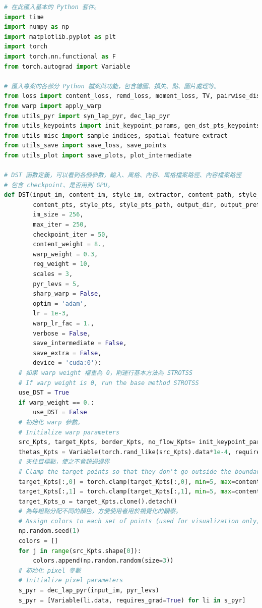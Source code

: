 \documentclass[10pt,UTF8]{ctexart}
\begin{document}
\begin{lstlisting}[language={python}]
# 在此匯入基本的 Python 套件。
import time
import numpy as np
import matplotlib.pyplot as plt
import torch
import torch.nn.functional as F
from torch.autograd import Variable

# 匯入專案的各部分 Python 檔案與功能，包含繪圖、損失、點、圖片處理等。
from loss import content_loss, remd_loss, moment_loss, TV, pairwise_distances_sq_l2
from warp import apply_warp
from utils_pyr import syn_lap_pyr, dec_lap_pyr
from utils_keypoints import init_keypoint_params, gen_dst_pts_keypoints
from utils_misc import sample_indices, spatial_feature_extract
from utils_save import save_loss, save_points
from utils_plot import save_plots, plot_intermediate

# DST 函數定義，可以看到各個參數，輸入、風格、內容、風格檔案路徑、內容檔案路徑
# 包含 checkpoint、是否用到 GPU。
def DST(input_im, content_im, style_im, extractor, content_path, style_path,
        content_pts, style_pts, style_pts_path, output_dir, output_prefix,
        im_size = 256,
        max_iter = 250,
        checkpoint_iter = 50,
        content_weight = 8.,
        warp_weight = 0.3,
        reg_weight = 10,
        scales = 3,
        pyr_levs = 5,
        sharp_warp = False,
        optim = 'adam',
        lr = 1e-3,
        warp_lr_fac = 1.,
        verbose = False,
        save_intermediate = False,
        save_extra = False,
        device = 'cuda:0'):
    # 如果 warp weight 權重為 0，則運行基本方法為 STROTSS
    # If warp weight is 0, run the base method STROTSS
    use_DST = True
    if warp_weight == 0.:
        use_DST = False
    # 初始化 warp 參數。
    # Initialize warp parameters
    src_Kpts, target_Kpts, border_Kpts, no_flow_Kpts= init_keypoint_params(input_im, content_path, content_pts, style_pts, device)
    thetas_Kpts = Variable(torch.rand_like(src_Kpts).data*1e-4, requires_grad=True)
    # 夾住目標點，使之不會超過邊界
    # Clamp the target points so that they don't go outside the boundary
    target_Kpts[:,0] = torch.clamp(target_Kpts[:,0], min=5, max=content_im.size(2)-5)
    target_Kpts[:,1] = torch.clamp(target_Kpts[:,1], min=5, max=content_im.size(3)-5)
    target_Kpts_o = target_Kpts.clone().detach()
    # 為每組點分配不同的顏色，方便使用者用於視覺化的觀察。
    # Assign colors to each set of points (used for visualization only)
    np.random.seed(1)
    colors = []
    for j in range(src_Kpts.shape[0]):
        colors.append(np.random.random(size=3))
    # 初始化 pixel 參數
    # Initialize pixel parameters
    s_pyr = dec_lap_pyr(input_im, pyr_levs)
    s_pyr = [Variable(li.data, requires_grad=True) for li in s_pyr]
    

\end{lstlisting}
\end{document}
